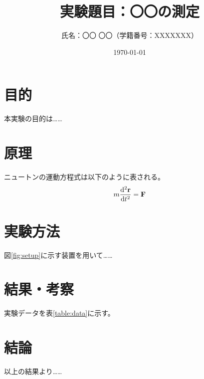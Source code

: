 \documentclass[lualatex,ja=standard]{bxjsarticle}
\title{実験題目：〇〇の測定}
\author{氏名：〇〇 〇〇（学籍番号：XXXXXXX）}
\date{\today}
\begin{document}
\maketitle

\section{目的}
本実験の目的は……

\section{原理}
ニュートンの運動方程式は以下のように表される。
\begin{equation}
    m \frac{\dd^2 \vb{r}}{\dd t^2} = \vb{F}
\end{equation}

\section{実験方法}
図\ref{fig:setup}に示す装置を用いて……

\section{結果・考察}
実験データを表\ref{table:data}に示す。

\section{結論}
以上の結果より……
\end{document}

